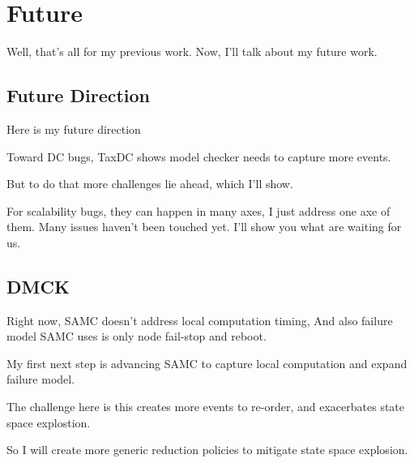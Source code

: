 
\section{Future}


Well, that's all for my previous work. Now, I'll talk about my future work.

\subsection{Future Direction}

Here is my future direction

Toward DC bugs, TaxDC shows model checker needs to capture more events.

But to do that more challenges lie ahead, which I'll show.

For scalability bugs, they can happen in many axes, I just address one axe of
them. Many issues haven't been touched yet. I'll show you what are waiting for
us.

\subsection{DMCK}

Right now, SAMC doesn't address local computation timing, And also failure
model SAMC uses is only node fail-stop and reboot.

My first next step is advancing SAMC to capture local computation and expand
failure model.

The challenge here is this creates more events to re-order, and exacerbates
state space explostion.

So I will create more generic reduction policies to mitigate state space
explosion.

%
%


